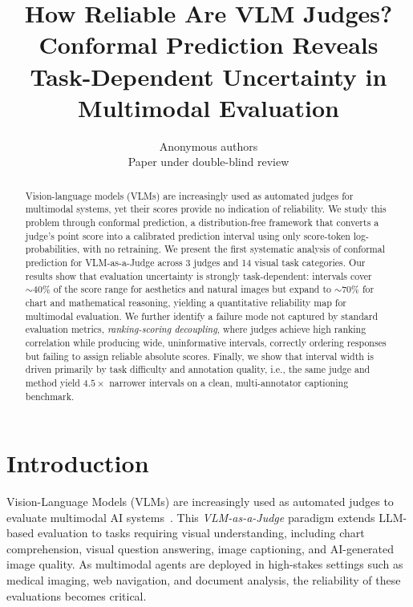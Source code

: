 \documentclass{article}
\title{How Reliable Are VLM Judges? Conformal Prediction Reveals Task-Dependent Uncertainty in Multimodal Evaluation}
\author{Anonymous authors\\Paper under double-blind review}
\begin{document}
\ifcolmsubmission
\linenumbers
\fi

\maketitle

\begin{abstract}
Vision-language models (VLMs) are increasingly used as automated judges for multimodal systems, yet their scores provide no indication of reliability. We study this problem through conformal prediction, a distribution-free framework that converts a judge's point score into a calibrated prediction interval using only score-token log-probabilities, with no retraining. 
We present the first systematic analysis of conformal prediction for VLM-as-a-Judge across 3 judges and 14 visual task categories. Our results show that evaluation uncertainty is strongly task-dependent: intervals cover $\sim 40\%$ of the score range for aesthetics and natural images but expand to $\sim 70\%$ for chart and mathematical reasoning, yielding a quantitative reliability map for multimodal evaluation. 
We further identify a failure mode not captured by standard evaluation metrics, \emph{ranking-scoring decoupling}, where judges achieve high ranking correlation while producing wide, uninformative intervals, correctly ordering responses but failing to assign reliable absolute scores. 
Finally, we show that interval width is driven primarily by task difficulty and annotation quality, i.e., the same judge and method yield $4.5\times$ narrower intervals on a clean, multi-annotator captioning benchmark. 
\end{abstract}

\section{Introduction}
\label{sec:intro}

Vision-Language Models (VLMs) are increasingly used as automated judges to evaluate multimodal AI systems~\citep{chen2024mllmasajudge,li2024vlrewardbench}. This \emph{VLM-as-a-Judge} paradigm extends LLM-based evaluation to tasks requiring visual understanding, including chart comprehension, visual question answering, image captioning, and AI-generated image quality. As multimodal agents are deployed in high-stakes settings such as medical imaging, web navigation, and document analysis, the reliability of these evaluations becomes critical. 
\end{document}
